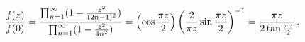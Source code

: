 \begin{equation}
\frac{f(z)}{f(0)}=\frac{\prod_{n=1}^{\infty }(1-{\frac{z^{2}}{(2n-1)^{2}}})}{%
\prod_{n=1}^{\infty }(1-{\frac{z^{2}}{4n^{2}}})}=\left( \cos {\frac{\pi z}{2}%
}\right) \left( {\frac{2}{\pi z}}\sin {\frac{\pi z}{2}}\right) ^{-1}=\frac{%
\pi z}{2\tan {\frac{\pi z}{2}}}\,.
\end{equation}

